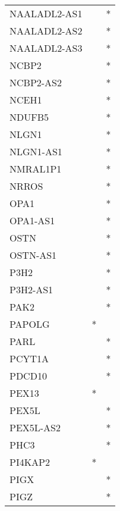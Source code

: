 \begin{longtable}{lcc}
NAALADL2-AS1     &                &          * \\
NAALADL2-AS2     &                &          * \\
NAALADL2-AS3     &                &          * \\
NCBP2            &                &          * \\
NCBP2-AS2        &                &          * \\
NCEH1            &                &          * \\
NDUFB5           &                &          * \\
NLGN1            &                &          * \\
NLGN1-AS1        &                &          * \\
NMRAL1P1         &                &          * \\
NRROS            &                &          * \\
OPA1             &                &          * \\
OPA1-AS1         &                &          * \\
OSTN             &                &          * \\
OSTN-AS1         &                &          * \\
P3H2             &                &          * \\
P3H2-AS1         &                &          * \\
PAK2             &                &          * \\
PAPOLG           &              * &            \\
PARL             &                &          * \\
PCYT1A           &                &          * \\
PDCD10           &                &          * \\
PEX13            &              * &            \\
PEX5L            &                &          * \\
PEX5L-AS2        &                &          * \\
PHC3             &                &          * \\
PI4KAP2          &              * &            \\
PIGX             &                &          * \\
PIGZ             &                &          * \\

\end{longtable}
